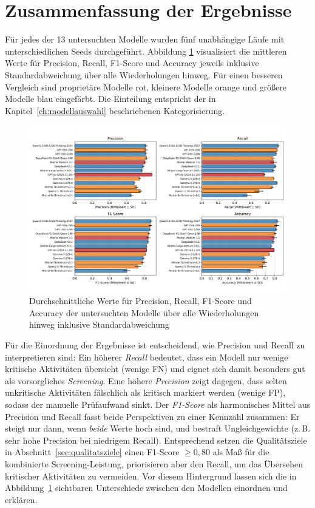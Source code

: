 \section{Zusammenfassung der Ergebnisse}\label{sec:ueberblick}

Für jedes der 13 untersuchten Modelle wurden fünf unabhängige Läufe mit unterschiedlichen Seeds durchgeführt. Abbildung \ref{fig:results-evaluation-metrics-comparison} visualisiert die mittleren Werte für Precision, Recall, F1-Score und Accuracy jeweils inklusive Standardabweichung über alle Wiederholungen hinweg. Für einen besseren Vergleich sind proprietäre Modelle rot, kleinere Modelle orange und größere Modelle blau eingefärbt. Die Einteilung entspricht der in Kapitel~\ref{ch:modellauswahl} beschriebenen Kategorisierung.

\begin{figure}[h]
    \centering
    \includegraphics[width=\textwidth]{images/results/evaluation_metrics_comparison}
    \caption{Durchschnittliche Werte für Precision, Recall, F1-Score und Accuracy der untersuchten Modelle über alle Wiederholungen hinweg inklusive Standardabweichung}
    \label{fig:results-evaluation-metrics-comparison}
\end{figure}

Für die Einordnung der Ergebnisse ist entscheidend, wie Precision und Recall zu interpretieren sind: Ein höherer \emph{Recall} bedeutet, dass ein Modell nur wenige kritische Aktivitäten übersieht (wenige \ac{FN}) und eignet sich damit besonders gut als vorsorgliches \emph{Screening}. Eine höhere \emph{Precision} zeigt dagegen, dass selten unkritische Aktivitäten fälschlich als kritisch markiert werden (wenige \ac{FP}), sodass der manuelle Prüfaufwand sinkt. Der \emph{F1-Score} als harmonisches Mittel aus Precision und Recall fasst beide Perspektiven zu einer Kennzahl zusammen: Er steigt nur dann, wenn \emph{beide} Werte hoch sind, und bestraft Ungleichgewichte (z.\,B. sehr hohe Precision bei niedrigem Recall). Entsprechend setzen die Qualitätsziele in Abschnitt~\ref{sec:qualitatsziele} einen F1-Score $\geq 0{,}80$ als Maß für die kombinierte Screening-Leistung, priorisieren aber den Recall, um das Übersehen kritischer Aktivitäten zu vermeiden. Vor diesem Hintergrund lassen sich die in Abbildung~\ref{fig:results-evaluation-metrics-comparison} sichtbaren Unterschiede zwischen den Modellen einordnen und erklären.

